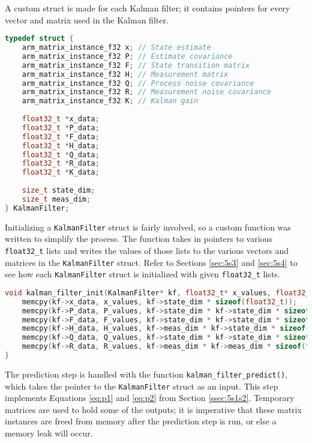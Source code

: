 \documentclass[11pt]{ucthesisCP}
\begin{document}
A custom struct is made for each Kalman filter; it contains pointers for every vector and matrix used in the Kalman filter.

\begin{lstlisting}[language=C++]
typedef struct {
	arm_matrix_instance_f32 x; // State estimate
	arm_matrix_instance_f32 P; // Estimate covariance
	arm_matrix_instance_f32 F; // State transition matrix
	arm_matrix_instance_f32 H; // Measurement matrix
	arm_matrix_instance_f32 Q; // Process noise covariance
	arm_matrix_instance_f32 R; // Measurement noise covariance
	arm_matrix_instance_f32 K; // Kalman gain
	
	float32_t *x_data;
	float32_t *P_data;
	float32_t *F_data;
	float32_t *H_data;
	float32_t *Q_data;
	float32_t *R_data;
	float32_t *K_data;
	
	size_t state_dim;
	size_t meas_dim;
} KalmanFilter;
\end{lstlisting}

Initializing a \verb|KalmanFilter| struct is fairly involved, so a custom function was written to simplify the process. The function takes in pointers to various \verb|float32_t| lists and writes the values of those lists to the various vectors and matrices in the \verb|KalmanFilter| struct. Refer to Sections \ref{sec:5s3} and \ref{sec:5s4} to see how each \verb|KalmanFilter| struct is initialized with given \verb|float32_t| lists.

\begin{lstlisting}[language=C++]
void kalman_filter_init(KalmanFilter* kf, float32_t* x_values, float32_t* P_values, float32_t* F_values, float32_t* H_values, float32_t* Q_values, float32_t* R_values) {
	memcpy(kf->x_data, x_values, kf->state_dim * sizeof(float32_t));
	memcpy(kf->P_data, P_values, kf->state_dim * kf->state_dim * sizeof(float32_t));
	memcpy(kf->F_data, F_values, kf->state_dim * kf->state_dim * sizeof(float32_t));
	memcpy(kf->H_data, H_values, kf->meas_dim * kf->state_dim * sizeof(float32_t));
	memcpy(kf->Q_data, Q_values, kf->state_dim * kf->state_dim * sizeof(float32_t));
	memcpy(kf->R_data, R_values, kf->meas_dim * kf->meas_dim * sizeof(float32_t));
}
\end{lstlisting}

The prediction step is handled with the function \verb|kalman_filter_predict()|, which takes the pointer to the \verb|KalmanFilter| struct as an input. This step implements Equations \ref{eq:p1} and \ref{eq:p2} from Section \ref{ssec:5s1s2}. Temporary matrices are used to hold some of the outputs; it is imperative that these matrix instances are freed from memory after the prediction step is run, or else a memory leak will occur.
\end{document}
